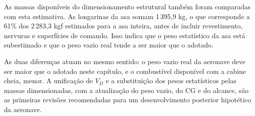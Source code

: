 As massas disponíveis do dimensionamento estrutural também foram comparadas com esta estimativa. As longarinas da asa somam 1\,395,9 kg, o que corresponde a 61\% dos 2\,283,3 kgf estimados para a asa inteira, antes de incluir revestimento, nervuras e superfícies de comando. Isso indica que o peso estatístico da asa está subestimado e que o peso vazio real tende a ser maior que o adotado.

As duas diferenças atuam no mesmo sentido: o peso vazio real da aeronave deve ser maior que o adotado neste capítulo, e o combustível disponível com a cabine cheia, menor. A unificação de $V_D$ e a substituição dos pesos estatísticos pelas massas dimensionadas, com a atualização do peso vazio, do CG e do alcance, são as primeiras revisões recomendadas para um desenvolvimento posterior hipotético da aeronave.
